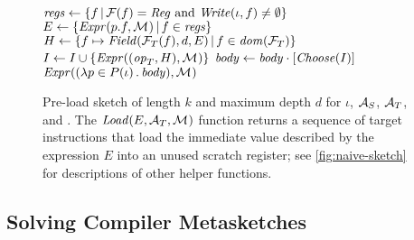 \begin{figure}[H]
\begin{algorithmic}[1]
            \State $\mathit{regs} \gets \{ f \,|\, \mathcal{F}(f) = \mathit{Reg} \text{ and } \mathit{Write}(\iota,f) \neq \emptyset \}$ 
            \State $E \gets \{\mathit{Expr}(p.f, \mathcal{M}_{}) \,|\, f\in\mathit{regs}\}$ 
            \State $H \gets \{ f\mapsto \mathit{Field}(\mathcal{F}_T(f),d,E) \,|\, f\in\mathit{dom}(\mathcal{F}_T)\} $  
            \State $I\gets I \cup \{ \mathit{Expr}((\mathit{op}_T, H),\mathcal{M}_{}) \}$ 
          \EndIf
        \EndFor
        \State $\mathit{body} \gets \mathit{body} \cdot [\mathit{Choose}(I)]$ 
      \EndFor
      \State \Return $\mathit{Expr}((\lambda p\in P(\iota)\, .\, \mathit{body}),\mathcal{M}_{})$ 
    \EndFunction
  \end{algorithmic}
  \caption{Pre-load sketch of length $k$ and maximum depth $d$ for $\iota$,
  $\mathcal{A}_S$, $\mathcal{A}_T$, and \Map. The $\mathit{Load}(E, \mathcal{A}_T, \mathcal{M}_{})$ function
  returns a sequence of target instructions that load the immediate value
  described by the expression $E$ into an unused scratch register; see
  \autoref{fig:naive-sketch} for descriptions of other helper
  functions.\tighten}\label{fig:lcs-sketch}
\end{figure}


\subsection{Solving Compiler Metasketches}\label{s:algorithm:solving}

